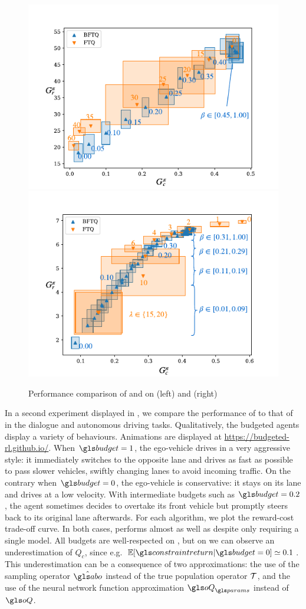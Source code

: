 \begin{figure}[tp]
	\begin{center}
		\includegraphics[width=0.49\linewidth]{img/slot-filling}
		\includegraphics[width=0.49\linewidth]{img/highway}
		\caption{Performance comparison of \FTQl and \BFTQ on  (left) and (right) }
		\label{sec:brl-results}
	\end{center}
\end{figure}

In a second experiment displayed in , we compare the performance of \FTQl to that of \BFTQ in the dialogue and autonomous driving tasks. 
Qualitatively, the budgeted agents display a variety of behaviours. Animations are displayed at  \href{https://budgeted-rl.github.io/\#driving-styles}{https://budgeted-rl.github.io/}. When $\budget = 1$, the ego-vehicle drives in a very aggressive style: it immediately switches to the opposite lane and drives as fast as possible to pass slower vehicles, swiftly changing lanes to avoid incoming traffic. On the contrary when $\budget = 0$, the ego-vehicle is conservative: it stays on its lane and drives at a low velocity. With intermediate budgets such as $\budget = 0.2$, the agent sometimes decides to overtake its front vehicle but promptly steers back to its original lane afterwards.
For each algorithm, we plot the reward-cost trade-off curve. In both cases, \BFTQ performs almost as well as \FTQl despite only requiring a single model. All budgets are well-respected on , but on  we can observe an underestimation of $Q_c$, since e.g. $\expectedvalue[\constraintreturn|\budget=0] \simeq 0.1 $. This underestimation can be a consequence of two approximations: the use of the sampling operator $\hat{\abo}$ instead of the true population operator $\mathcal{T}$, and the use of the neural network function approximation $\oQ_\params$ instead of $\oQ$.

